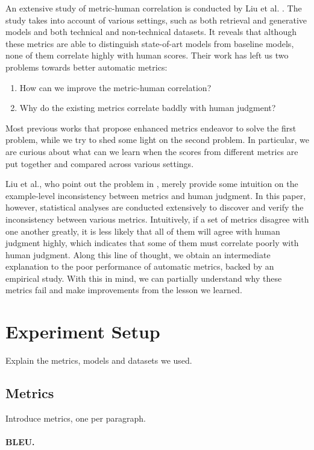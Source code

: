 \documentclass[runningheads]{llncs}
\begin{document}
    An extensive study of metric-human correlation is conducted by Liu et al. \cite{HowNot}. The study takes into account of various settings, such as both retrieval and generative models and both technical and non-technical datasets. It reveals that although these metrics are able to distinguish state-of-art models from baseline models, none of them correlate highly with human scores. Their work has left us two problems towards better automatic metrics:
    \begin{enumerate}
        \item How can we improve the metric-human correlation?
        \item Why do the existing metrics correlate baddly with human judgment?
    \end{enumerate}
    Most previous works that propose enhanced metrics endeavor to solve the first problem, while we try to shed some light on the second problem. In particular, we are curious about what can we learn when the scores from different metrics are put together and compared across various settings.

    Liu et al., who point out the problem in \cite{HowNot}, merely provide some intuition on the example-level inconsistency between metrics and human judgment. In this paper, however, statistical analyses are conducted extensively to discover and verify the inconsistency between various metrics. Intuitively, if a set of metrics disagree with one another greatly, it is less likely that all of them will agree with human judgment highly, which indicates that some of them must correlate poorly with human judgment. Along this line of thought, we obtain an intermediate explanation to the poor performance of automatic metrics, backed by an empirical study. With this in mind, we can partially understand why these metrics fail and make improvements from the lesson we learned.

    \section{Experiment Setup}
    Explain the metrics, models and datasets we used.

    \subsection{Metrics}
    Introduce metrics, one per paragraph.
    \paragraph{BLEU.}
\end{document}
